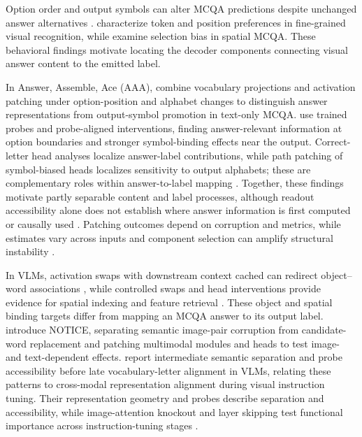 \documentclass[11pt]{article}
\begin{document}
Option order and output symbols can alter MCQA predictions despite unchanged answer alternatives \citep{zheng2024large}. \citet{atabuzzaman2025benchmarking} characterize token and position preferences in fine-grained visual recognition, while \citet{zeno2025choosing} examine selection bias in spatial MCQA. These behavioral findings motivate locating the decoder components connecting visual answer content to the emitted label.

In Answer, Assemble, Ace (AAA), \citet{wiegreffe2025answerassembleaceunderstanding} combine vocabulary projections and activation patching under option-position and alphabet changes to distinguish answer representations from output-symbol promotion in text-only MCQA. \citet{wong2026decidebind} use trained probes and probe-aligned interventions, finding answer-relevant information at option boundaries and stronger symbol-binding effects near the output. Correct-letter head analyses localize answer-label contributions, while path patching of symbol-biased heads localizes sensitivity to output alphabets; these are complementary roles within answer-to-label mapping \citep{lieberum2023doescircuitanalysisinterpretability,yang2025option}. Together, these findings motivate partly separable content and label processes, although readout accessibility alone does not establish where answer information is first computed or causally used \citep{wiegreffe2025answerassembleaceunderstanding,wong2026decidebind}. Patching outcomes depend on corruption and metrics, while estimates vary across inputs and component selection can amplify structural instability \citep{zhang2024bestpracticesactivationpatching,meloux2026statistical}.

In VLMs, activation swaps with downstream context cached can redirect object--word associations \citep{saravanan2025investigatingmechanismsincontextvision}, while controlled swaps and head interventions provide evidence for spatial indexing and feature retrieval \citep{assouel2026visualsymbolic}. These object and spatial binding targets differ from mapping an MCQA answer to its output label. \citet{golovanevsky2025notice} introduce NOTICE, separating semantic image-pair corruption from candidate-word replacement and patching multimodal modules and heads to test image- and text-dependent effects. \citet{palacios2026abstraction} report intermediate semantic separation and probe accessibility before late vocabulary-letter alignment in VLMs, relating these patterns to cross-modal representation alignment during visual instruction tuning. Their representation geometry and probes describe separation and accessibility, while image-attention knockout and layer skipping test functional importance across instruction-tuning stages \citep{palacios2026abstraction}.
\end{document}
